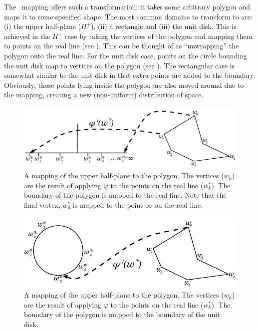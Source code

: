 The \sch\ mapping offers such a transformation; it takes some arbitrary polygon and maps it to some specified shape. The most common domains to transform to are: (i) the upper half-plane ($H^+$), (ii) a rectangle and (iii) the unit disk. This is achieved in the $H^+$ case by taking the vertices of the polygon and mapping them to points on the real line (see ). This can be thought of as ``unwrapping'' the polygon onto the real line. For the unit disk case, points on the circle bounding the unit disk map to vertices on the polygon (see ). The rectangular case is somewhat similar to the unit disk in that extra points are added to the boundary. Obviously, those points lying inside the polygon are also moved around due to the mapping, creating a new (non-uniform) distribution of space.

\begin{figure} [t]
\centering
\includegraphics[scale=0.6]{sc/figs/reallinedia.pdf}
\caption{A mapping of the upper half-plane to the polygon. The vertices ($w_k$) are the result of applying $\varphi$ to the points on the real line ($w^*_k$). The boundary of the polygon is mapped to the real line. Note that the final vertex, $w^*_6$ is mapped to the point $\infty$ on the real line.}
\label{reallinedia}
\end{figure}

\begin{figure} [t]
\centering
\includegraphics[scale=0.6]{sc/figs/unitdiskdia.pdf}
\caption{A mapping of the upper half-plane to the polygon. The vertices ($w_k$) are the result of applying $\varphi$ to the points on the real line ($w^*_k$). The boundary of the polygon is mapped to the boundary of the unit disk.}
\label{unitdiskdia}
\end{figure}


